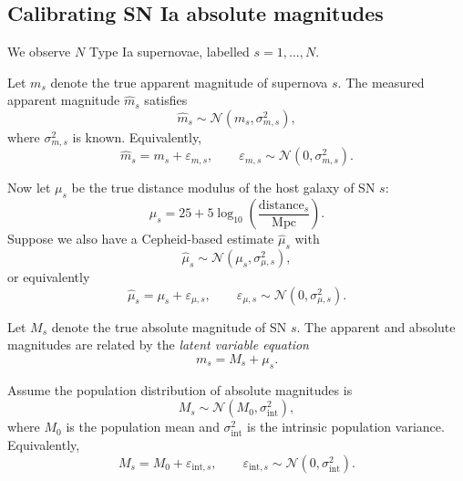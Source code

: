 \documentclass[11pt, titlepage]{article} %
\numberwithin{equation}{section}
\theoremstyle{definition}
\numberwithin{assumption}{section}
\begin{document}
\subsection{Calibrating SN Ia absolute magnitudes}



We observe $N$ Type Ia supernovae, labelled $s=1,\dots,N$.

Let $m_s$ denote the true apparent magnitude of supernova $s$. The measured apparent magnitude $\hat m_s$ satisfies
\begin{equation*}
    \hat m_s \sim \mathcal{N}(m_s,\sigma_{m,s}^2),
\end{equation*}
where $\sigma_{m,s}^2$ is known. Equivalently,
\begin{equation*}
    \hat m_s = m_s + \varepsilon_{m,s},
    \qquad
    \varepsilon_{m,s}\sim \mathcal{N}(0,\sigma_{m,s}^2).
\end{equation*}

Now let $\mu_s$ be the true distance modulus of the host galaxy of SN $s$:
\begin{equation*}
    \mu_s = 25+5\log_{10}\!\left(\frac{\text{distance}_s}{\mathrm{Mpc}}\right).
\end{equation*}
Suppose we also have a Cepheid-based estimate $\hat \mu_s$ with
\begin{equation*}
    \hat \mu_s \sim \mathcal{N}(\mu_s,\sigma_{\mu,s}^2),
\end{equation*}
or equivalently
\begin{equation*}
    \hat \mu_s = \mu_s + \varepsilon_{\mu,s},
    \qquad
    \varepsilon_{\mu,s}\sim \mathcal{N}(0,\sigma_{\mu,s}^2).
\end{equation*}

Let $M_s$ denote the true absolute magnitude of SN $s$. The apparent and absolute magnitudes are related by the \textit{latent variable equation}
\begin{equation*}
    m_s=M_s+\mu_s.
\end{equation*}

Assume the population distribution of absolute magnitudes is
\begin{equation*}
    M_s \sim \mathcal{N}(M_0,\sigma_{\mathrm{int}}^2),
\end{equation*}
where $M_0$ is the population mean and $\sigma_{\mathrm{int}}^2$ is the intrinsic population variance. Equivalently,
\begin{equation*}
    M_s = M_0 + \varepsilon_{\mathrm{int},s},
    \qquad
    \varepsilon_{\mathrm{int},s}\sim \mathcal{N}(0,\sigma_{\mathrm{int}}^2).
\end{equation*}
\end{document}
